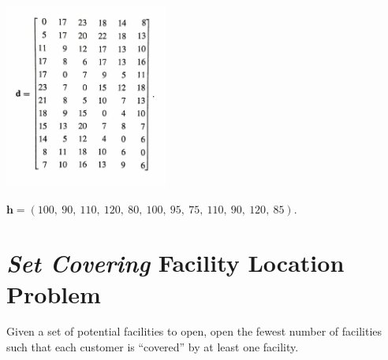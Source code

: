 \documentclass[11pt]{article}
\theoremstyle{definition}
\begin{document}
\vfill
\includegraphics[width = 0.4\textwidth]{Distances}

\vfill
$\textbf{h} = (100,~ 90,~ 110,~ 120,~ 80,~ 100,~ 95, ~75,~ 110,~ 90, ~120, ~85).$

\vfill


\newpage

\vspace{1in}
\section{\emph{Set Covering} Facility Location Problem}

Given a set of potential facilities to open, open the fewest number of facilities such that each customer is ``covered'' by at least one facility.
\end{document}
